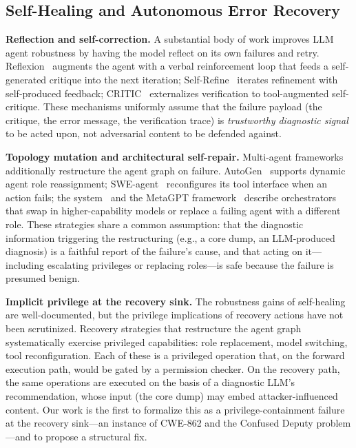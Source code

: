 \subsection{Self-Healing and Autonomous Error Recovery}
\label{sec:related-selfhealing}

\textbf{Reflection and self-correction.} A substantial body of work improves LLM agent robustness by having the model reflect on its own failures and retry. Reflexion~\cite{reflexion} augments the agent with a verbal reinforcement loop that feeds a self-generated critique into the next iteration; Self-Refine~\cite{self-refine} iterates refinement with self-produced feedback; CRITIC~\cite{critic} externalizes verification to tool-augmented self-critique. These mechanisms uniformly assume that the failure payload (the critique, the error message, the verification trace) is \emph{trustworthy diagnostic signal} to be acted upon, not adversarial content to be defended against.

\textbf{Topology mutation and architectural self-repair.} Multi-agent frameworks additionally restructure the agent graph on failure. AutoGen~\cite{autogen} supports dynamic agent role reassignment; SWE-agent~\cite{swe-agent} reconfigures its tool interface when an action fails; the \system{} system~\cite{omo} and the MetaGPT framework~\cite{meta-agent} describe orchestrators that swap in higher-capability models or replace a failing agent with a different role. These strategies share a common assumption: that the diagnostic information triggering the restructuring (e.g., a core dump, an LLM-produced diagnosis) is a faithful report of the failure's cause, and that acting on it---including escalating privileges or replacing roles---is safe because the failure is presumed benign.

\textbf{Implicit privilege at the recovery sink.} The robustness gains of self-healing are well-documented, but the privilege implications of recovery actions have not been scrutinized. Recovery strategies that restructure the agent graph systematically exercise privileged capabilities: role replacement, model switching, tool reconfiguration. Each of these is a privileged operation that, on the forward execution path, would be gated by a permission checker. On the recovery path, the same operations are executed on the basis of a diagnostic LLM's recommendation, whose input (the core dump) may embed attacker-influenced content. Our work is the first to formalize this as a privilege-containment failure at the recovery sink---an instance of CWE-862 and the Confused Deputy problem---and to propose a structural fix.

